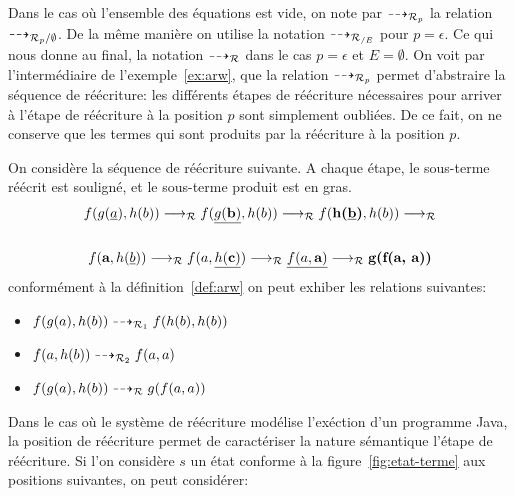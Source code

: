 Dans le cas où l'ensemble des équations est vide, on note par $\dashrightarrow_{\mathcal R_p}$ la relation $\dashrightarrow_{\mathcal R_p/\emptyset}$.
De la même manière on utilise la notation $\dashrightarrow_{\mathcal R_{/E}}$ pour $p = \epsilon$. Ce qui nous donne au final, la notation
$\dashrightarrow_\mathcal R$ dans le cas $p = \epsilon$ et $E = \emptyset$.
On voit par l'intermédiaire de l'exemple~\ref{ex:arw}, que la relation $\dashrightarrow_{\mathcal R_p}$ permet 
d'abstraire la séquence de réécriture: les différents étapes de réécriture nécessaires
pour arriver à l'étape de réécriture à la position $p$ sont simplement oubliées.
De ce fait, on ne conserve que les termes qui sont produits par la réécriture à la position $p$.
\begin{example}
  \label{ex:arw}
  On considère la séquence de réécriture suivante. A chaque étape, le
  sous-terme réécrit est souligné, et le sous-terme produit est en
  gras.
  \begin{multline*}
    f(g(\underline{a}), h(b)) \lrw_\R 
    f(\underline{g(\textbf{b})}, h(b)) \lrw_\R 
    f(\textbf{h(\underline{b})}, h(b)) \lrw_\R
    \\
    \\
    f(\textbf{a}, h(\underline{b})) \lrw_\R 
    f(a, \underline{h(\textbf{c})}) \lrw_\R 
    \underline{f(a, \textbf{a})} \lrw_\R 
    \textbf{g(f(a, a))} %
  \end{multline*}
  conformément à la définition~\ref{def:arw} on peut exhiber les relations suivantes:
  
  \medskip
  \begin{itemize}
  \item $f(g(a), h(b)) \dashrightarrow_{\mathcal R_1} f(h(b), h(b))$
  \item $f(a, h(b)) \dashrightarrow_{\mathcal R_2} f(a, a)$
  \item $f(g(a), h(b)) \dashrightarrow_\mathcal R g(f(a,a))$
  \end{itemize}
\end{example}

Dans le cas où le système de réécriture modélise l'exéction d'un programme Java, la position de réécriture
permet de caractériser la nature sémantique l'étape de réécriture.
Si l'on considère $s$ un état conforme à la figure~\ref{fig:etat-terme} aux positions suivantes, on peut considérer:

